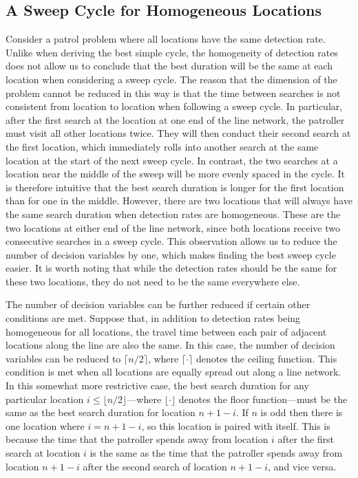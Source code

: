 \documentclass[11pt,a4paper]{article}
\begin{document}
\subsection{A Sweep Cycle for Homogeneous Locations} \label{sec: a sweep cycle for homogeneous locations}
Consider a patrol problem where all locations have the same detection rate.
Unlike when deriving the best simple cycle, the homogeneity of detection rates does not allow us to conclude that the best duration will be the same at each location when considering a sweep cycle.
The reason that the dimension of the problem cannot be reduced in this way is that the time between searches is not consistent from location to location when following a sweep cycle.
In particular, after the first search at the location at one end of the line network, the patroller must visit all other locations twice. 
They will then conduct their second search at the first location, which immediately rolls into another search at the same location at the start of the next sweep cycle.
In contrast, the two searches at a location near the middle of the sweep will be more evenly spaced in the cycle.
It is therefore intuitive that the best search duration is longer for the first location than for one in the middle.
However, there are two locations that will always have the same search duration when detection rates are homogeneous.
These are the two locations at either end of the line network, since both locations receive two consecutive searches in a sweep cycle.
This observation allows us to reduce the number of decision variables by one, which makes finding the best sweep cycle easier.
It is worth noting that while the detection rates should be the same for these two locations, they do not need to be the same everywhere else.

The number of decision variables can be further reduced if certain other conditions are met.
Suppose that, in addition to detection rates being homogeneous for all locations, the travel time between each pair of adjacent locations along the line are also the same. 
In this case, the number of decision variables can be reduced to $\lceil n / 2 \rceil$, where $\lceil\cdot\rceil$ denotes the ceiling function.
This condition is met when all locations are equally spread out along a line network.
In this somewhat more restrictive case, the best search duration for any particular location $i\leq \lfloor n / 2 \rfloor$---where $\lfloor\cdot\rfloor$ denotes the floor function---must be the same as the best search duration for location $n+1-i$. 
If $n$ is odd then there is one location where $i=n+1-i$, so this location is paired with itself.
This is because the time that the patroller spends away from location $i$ after the first search at location $i$ is the same as the time that the patroller spends away from location $n+1-i$ after the second search of location $n+1-i$, and vice versa.
\end{document}
